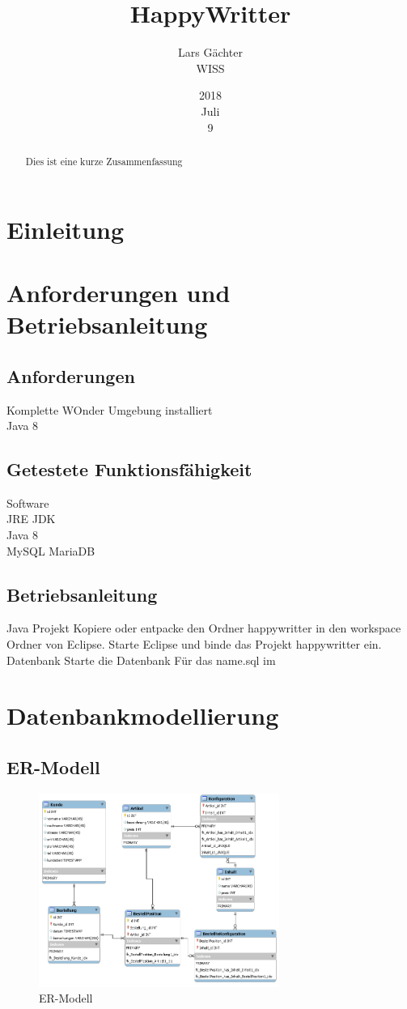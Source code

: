 \documentclass{article}
\title{HappyWritter}
\date{2018\\Juli\\9}
\author{Lars Gächter\\ WISS}
\begin{document}
\maketitle
\clearpage
\tableofcontents
\clearpage 
\begin{abstract}
Dies ist eine kurze Zusammenfassung
\end{abstract}
\section{Einleitung}
\section{Anforderungen und Betriebsanleitung}
\subsection{Anforderungen}
Komplette WOnder Umgebung installiert\\
Java 8
\subsection{Getestete Funktionsfähigkeit}
Software\\
JRE JDK %
\\
Java 8\\
MySQL MariaDB
\subsection{Betriebsanleitung}
Java Projekt
Kopiere oder entpacke den Ordner happywritter in den workspace Ordner von Eclipse.
Starte Eclipse und binde das Projekt happywritter ein.
Datenbank
Starte die Datenbank
Für das name.sql im 
\section{Datenbankmodellierung}
\subsection{ER-Modell}
\begin{figure}[h]
\begin{center}
\includegraphics[width=0.7\textwidth]{res/erd.png}
\caption{ER-Modell}
\label{er-modell}
\end{center}
\end{figure}
\end{document}
